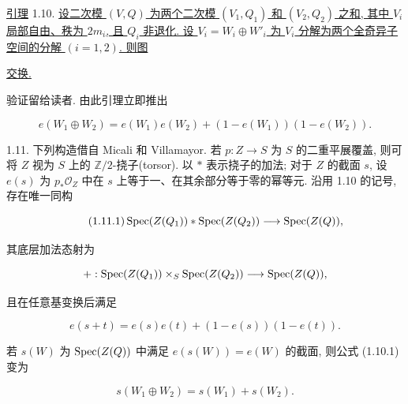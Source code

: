 \underline{引理} 1.10. \underline{设二次模 $(V,Q)$ 为两个二次模 $(V_1,Q_1)$ 和 $(V_2,Q_2)$ 之和, 其中 $V_i$ 局部自由、秩为 $2m_i$, 且 $Q_i$ 非退化. 设 $V_i=W_i\oplus W'_i$ 为 $V_i$ 分解为两个全奇异子空间的分解 $(i=1,2)$. 则图}

\begin{center}
\end{center}

\underline{交换.}


验证留给读者. 由此引理立即推出

\begin{equation}\tag{1.10.1}
e(W_1\oplus W_2)
=e(W_1)e(W_2)+(1-e(W_1))(1-e(W_2)).
\end{equation}

1.11. 下列构造借自 Micali 和 Villamayor. 若 $p:Z\longrightarrow S$ 为 $S$ 的二重平展覆盖, 则可将 $Z$ 视为 $S$ 上的 $\mathbb Z/2$-挠子(torsor). 以 $*$ 表示挠子的加法; 对于 $Z$ 的截面 $s$, 设 $e(s)$ 为 $p_*\mathcal O_Z$ 中在 $s$ 上等于一、在其余部分等于零的幂等元. 沿用 1.10 的记号, 存在唯一同构

\begin{equation}\tag{1.11.1}
\operatorname{Spec}(Z(Q_1))*\operatorname{Spec}(Z(Q_2))\longrightarrow\operatorname{Spec}(Z(Q)),
\end{equation}

其底层加法态射为

\begin{equation*}
+:\operatorname{Spec}(Z(Q_1))\times_S\operatorname{Spec}(Z(Q_2))
\longrightarrow\operatorname{Spec}(Z(Q)),
\end{equation*}

且在任意基变换后满足

\begin{equation*}
e(s+t)=e(s)e(t)+(1-e(s))(1-e(t)).
\end{equation*}

若 $s(W)$ 为 $\operatorname{Spec}(Z(Q))$ 中满足 $e(s(W))=e(W)$ 的截面, 则公式 (1.10.1) 变为

\begin{equation*}
s(W_1\oplus W_2)=s(W_1)+s(W_2).
\end{equation*}

